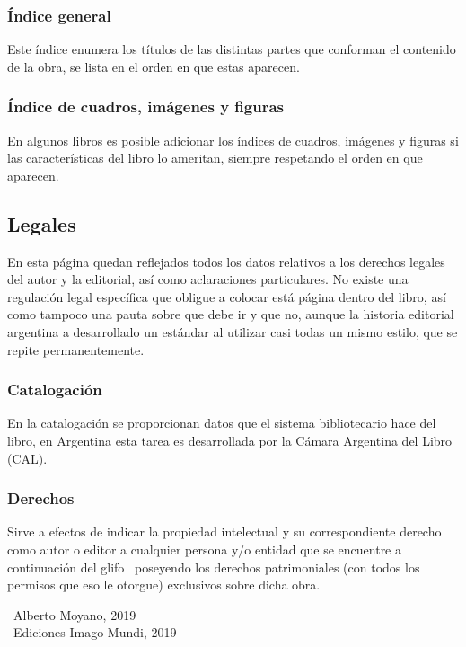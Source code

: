 \documentclass{book}
\begin{document}
{{{{{{{{{\subsubsection{Índice general}

Este índice enumera los títulos de las distintas partes que conforman el contenido de la obra, se lista en el orden en que estas aparecen.

\subsubsection{Índice de cuadros, imágenes y figuras}

En algunos libros es posible adicionar los índices de cuadros, imágenes y figuras si las características del libro lo ameritan, siempre respetando el orden en que aparecen.

\subsection{Legales}

En esta página quedan reflejados todos los datos relativos a los derechos legales del autor y la editorial, así como aclaraciones particulares. No existe una regulación legal específica que obligue a colocar está página dentro del libro, así como tampoco una pauta sobre que debe ir y que no, aunque la historia editorial argentina a desarrollado un estándar al utilizar casi todas un mismo estilo, que se repite permanentemente.

\subsubsection{Catalogación}

En la catalogación se proporcionan datos que el sistema bibliotecario hace del libro, en Argentina esta tarea es desarrollada por la Cámara Argentina del Libro (CAL).

\subsubsection{Derechos}

Sirve a efectos de indicar la propiedad intelectual y su correspondiente derecho como autor o editor a cualquier persona y/o entidad que se encuentre a continuación del \gls{glifo} \textcopyright~poseyendo los derechos patrimoniales (con todos los permisos que eso le otorgue) exclusivos sobre dicha obra.

\begin{mdframed}[linewidth=.5pt,linecolor=black!30,roundcorner=3pt,backgroundcolor=yellow!15]
\noindent \textcopyright~Alberto Moyano, 2019\\
\noindent \textcopyright~Ediciones Imago Mundi, 2019
\end{mdframed}

}}}}}}}}}
\end{document}
